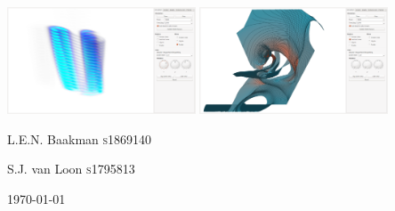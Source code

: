 \begin{titlepage}
        \vspace{40px}
        \includegraphics[width=0.42\textwidth, trim={35px 30px 430px 30px}, clip]{img/titlepage/slices2.png} \hspace{30px}
        \includegraphics[width=0.42\textwidth, trim={35px 30px 430px 30px}, clip]{img/titlepage/particles.png}        
    \vspace{1cm}\par

    {\Large L.E.N. Baakman \textsc{s}1869140\par}
    {\Large S.J. van Loon \textsc{s}1795813\par}

    \vfill
    {\large \today\par}
\end{titlepage}
\hypersetup{pageanchor=true}